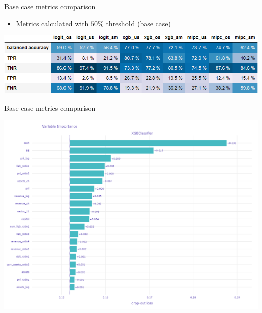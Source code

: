 \documentclass{beamer}
\begin{document}
\begin{frame}{Base case metrics comparison}

\begin{itemize}
\item Metrics calculated with $50$\% threshold (base case)
\end{itemize}

\begin{center}
\includegraphics[scale=0.6]{img/balance_acc_table.png}
\end{center}
\end{frame}

\begin{frame}{Base case metrics comparison}


\begin{center}
\includegraphics[scale=0.2]{img/xgb_exp.png}
\end{center}
\end{frame}
\end{document}
